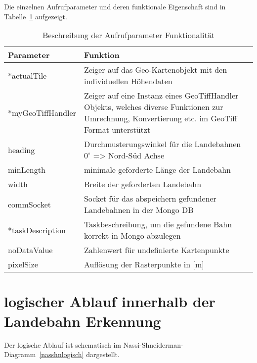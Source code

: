 \documentclass[10pt,a4paper]{report}
\begin{document}
Die einzelnen Aufrufparameter und deren funktionale Eigenschaft sind in Tabelle~\ref{beschreibungparameter} aufgezeigt.

\begin{table}[htb]
\centering
\begin{tabular}{|p{4.5cm}|p{10cm}|}
\hline 
\bf{Parameter} & \bf{Funktion} \\ 
\hline 
*actualTile & Zeiger auf das Geo-Kartenobjekt mit den individuellen Höhendaten \\ 
\hline 
*myGeoTiffHandler & Zeiger auf eine Instanz eines GeoTiffHandler Objekts, 
welches diverse Funktionen zur Umrechnung, Konvertierung etc. im GeoTiff Format unterstützt \\ 
\hline 
heading & Durchmusterungswinkel für die Landebahnen $0^\circ$ => Nord-Süd Achse \\ 
\hline 
minLength & minimale geforderte Länge der Landebahn \\ 
\hline 
width & Breite der geforderten Landebahn \\ 
\hline 
commSocket & Socket für das abspeichern gefundener Landebahnen in der Mongo DB\\ 
\hline 
*taskDescription & Taskbeschreibung, um die gefundene Bahn korrekt in Mongo abzulegen \\ 
\hline 
noDataValue & Zahlenwert für undefinierte Kartenpunkte \\ 
\hline 
pixelSize & Auflösung der Rasterpunkte in [m]\\
\hline 

\end{tabular} 
\caption{Beschreibung der Aufrufparameter Funktionalität}\label{beschreibungparameter}
\end{table}

\section{logischer Ablauf innerhalb der Landebahn Erkennung}

Der logische Ablauf ist schematisch im Nassi-Shneiderman-Diagramm~\ref{nasshnlogisch} dargestellt.
\end{document}
